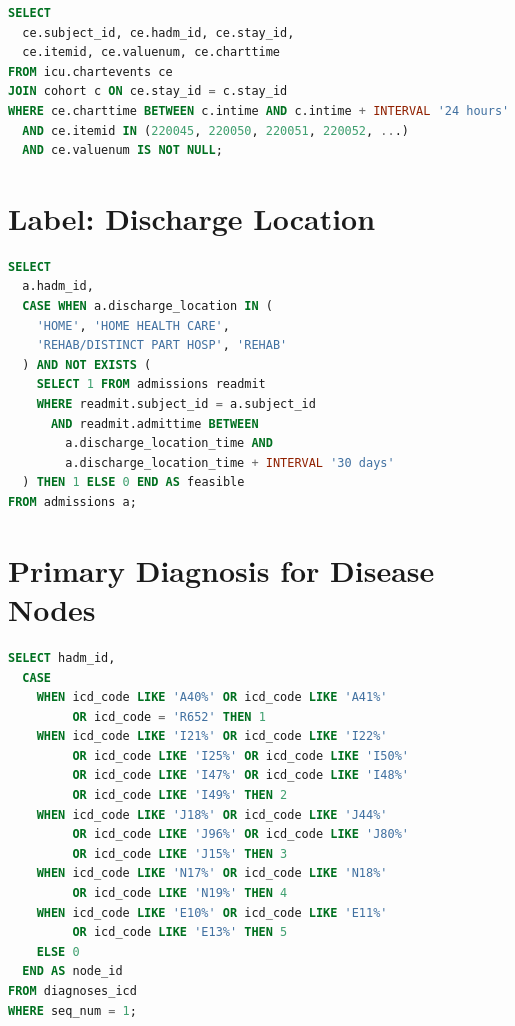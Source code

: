 \begin{lstlisting}[language=SQL, caption=Vitals from First 24h]
SELECT 
  ce.subject_id, ce.hadm_id, ce.stay_id,
  ce.itemid, ce.valuenum, ce.charttime
FROM icu.chartevents ce
JOIN cohort c ON ce.stay_id = c.stay_id
WHERE ce.charttime BETWEEN c.intime AND c.intime + INTERVAL '24 hours'
  AND ce.itemid IN (220045, 220050, 220051, 220052, ...)
  AND ce.valuenum IS NOT NULL;
\end{lstlisting}

\section{Label: Discharge Location}

\begin{lstlisting}[language=SQL, caption=Feasible Discharge]
SELECT 
  a.hadm_id,
  CASE WHEN a.discharge_location IN (
    'HOME', 'HOME HEALTH CARE', 
    'REHAB/DISTINCT PART HOSP', 'REHAB'
  ) AND NOT EXISTS (
    SELECT 1 FROM admissions readmit 
    WHERE readmit.subject_id = a.subject_id 
      AND readmit.admittime BETWEEN 
        a.discharge_location_time AND 
        a.discharge_location_time + INTERVAL '30 days'
  ) THEN 1 ELSE 0 END AS feasible
FROM admissions a;
\end{lstlisting}

\section{Primary Diagnosis for Disease Nodes}

\begin{lstlisting}[language=SQL, caption=Assign Primary ICD-10 to Nodes]
SELECT hadm_id,
  CASE 
    WHEN icd_code LIKE 'A40%' OR icd_code LIKE 'A41%' 
         OR icd_code = 'R652' THEN 1
    WHEN icd_code LIKE 'I21%' OR icd_code LIKE 'I22%' 
         OR icd_code LIKE 'I25%' OR icd_code LIKE 'I50%' 
         OR icd_code LIKE 'I47%' OR icd_code LIKE 'I48%' 
         OR icd_code LIKE 'I49%' THEN 2
    WHEN icd_code LIKE 'J18%' OR icd_code LIKE 'J44%' 
         OR icd_code LIKE 'J96%' OR icd_code LIKE 'J80%' 
         OR icd_code LIKE 'J15%' THEN 3
    WHEN icd_code LIKE 'N17%' OR icd_code LIKE 'N18%' 
         OR icd_code LIKE 'N19%' THEN 4
    WHEN icd_code LIKE 'E10%' OR icd_code LIKE 'E11%' 
         OR icd_code LIKE 'E13%' THEN 5
    ELSE 0
  END AS node_id
FROM diagnoses_icd
WHERE seq_num = 1;
\end{lstlisting}


